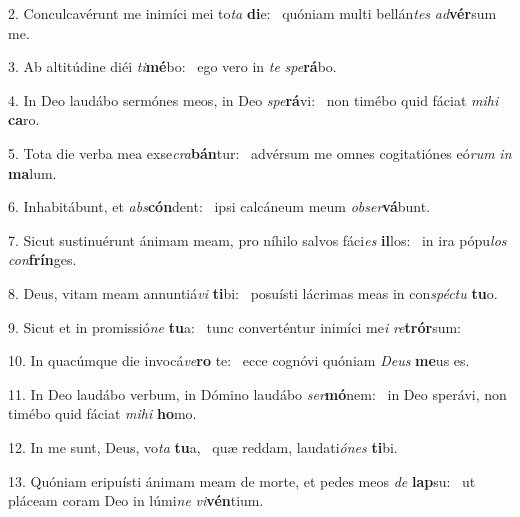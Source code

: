 2. Conculcavérunt me inimíci mei to\textit{ta} \textbf{di}e: \ast\  quóniam multi bellán\textit{tes} \textit{ad}\textbf{vér}sum me.\

3. Ab altitúdine diéi \textit{ti}\textbf{mé}bo: \ast\  ego vero in \textit{te} \textit{spe}\textbf{rá}bo.\

4. In Deo laudábo sermónes meos, in Deo \textit{spe}\textbf{rá}vi: \ast\  non timébo quid fáciat \textit{mi}\textit{hi} \textbf{ca}ro.\

5. Tota die verba mea exse\textit{cra}\textbf{bán}tur: \ast\  advérsum me omnes cogitatiónes eó\textit{rum} \textit{in} \textbf{ma}lum.\

6. Inhabitábunt, et \textit{abs}\textbf{cón}dent: \ast\  ipsi calcáneum meum \textit{ob}\textit{ser}\textbf{vá}bunt.\

7. Sicut sustinuérunt ánimam meam, pro níhilo salvos fáci\textit{es} \textbf{il}los: \ast\  in ira pópu\textit{los} \textit{con}\textbf{frín}ges.\

8. Deus, vitam meam annuntiá\textit{vi} \textbf{ti}bi: \ast\  posuísti lácrimas meas in con\textit{spéc}\textit{tu} \textbf{tu}o.\

9. Sicut et in promissió\textit{ne} \textbf{tu}a: \ast\  tunc converténtur inimíci me\textit{i} \textit{re}\textbf{trór}sum:\

10. In quacúmque die invocá\textit{ve}\textbf{ro} te: \ast\  ecce cognóvi quóniam \textit{De}\textit{us} \textbf{me}us es.\

11. In Deo laudábo verbum, in Dómino laudábo \textit{ser}\textbf{mó}nem: \ast\  in Deo sperávi, non timébo quid fáciat \textit{mi}\textit{hi} \textbf{ho}mo.\

12. In me sunt, Deus, vo\textit{ta} \textbf{tu}a, \ast\  quæ reddam, laudati\textit{ó}\textit{nes} \textbf{ti}bi.\

13. Quóniam eripuísti ánimam meam de morte, et pedes meos \textit{de} \textbf{lap}su: \ast\  ut pláceam coram Deo in lúmi\textit{ne} \textit{vi}\textbf{vén}tium.\

